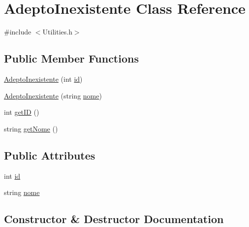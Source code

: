 \hypertarget{class_adepto_inexistente}{}\section{Adepto\+Inexistente Class Reference}
\label{class_adepto_inexistente}


{\ttfamily \#include $<$Utilities.\+h$>$}

\subsection*{Public Member Functions}
\begin{DoxyCompactItemize}
\item 
\hyperlink{class_adepto_inexistente_a2878cf170b9b750ca8beaa6ce3c30c4b}{Adepto\+Inexistente} (int \hyperlink{class_adepto_inexistente_ae58bcd6663bfa728a5c581b4befd2f25}{id})
\item 
\hyperlink{class_adepto_inexistente_a554e93ab0308ad692a76543401559e2b}{Adepto\+Inexistente} (string \hyperlink{class_adepto_inexistente_acaea652be13be5879b5fedb397a65634}{nome})
\item 
int \hyperlink{class_adepto_inexistente_a6dbe4bc4c8217bc6705c5dd2346ae77e}{get\+I\+D} ()
\item 
string \hyperlink{class_adepto_inexistente_a9c48a231fc680d29034877de0c838156}{get\+Nome} ()
\end{DoxyCompactItemize}
\subsection*{Public Attributes}
\begin{DoxyCompactItemize}
\item 
int \hyperlink{class_adepto_inexistente_ae58bcd6663bfa728a5c581b4befd2f25}{id}
\item 
string \hyperlink{class_adepto_inexistente_acaea652be13be5879b5fedb397a65634}{nome}
\end{DoxyCompactItemize}


\subsection{Constructor \& Destructor Documentation}
\hypertarget{class_adepto_inexistente_a2878cf170b9b750ca8beaa6ce3c30c4b}{}
